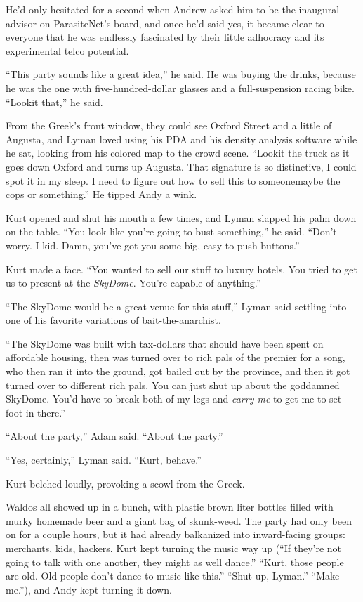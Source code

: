 He'd only hesitated for a second when Andrew asked him to be the
inaugural advisor on ParasiteNet's board, and once he'd said yes, it
became clear to everyone that he was endlessly fascinated by their
little adhocracy and its experimental telco potential.

``This party sounds like a great idea,'' he said.  He was buying the
drinks, because he was the one with five-hundred-dollar glasses and a
full-suspension racing bike.  ``Lookit that,'' he said.

From the Greek's front window, they could see Oxford Street and a
little of Augusta, and Lyman loved using his PDA and his density
analysis software while he sat, looking from his colored map to the
crowd scene.  ``Lookit the truck as it goes down Oxford and turns up
Augusta.  That signature is so distinctive, I could spot it in my
sleep.  I need to figure out how to sell this to someone\dash{}maybe the
cops or something.'' He tipped Andy a wink.

Kurt opened and shut his mouth a few times, and Lyman slapped his palm
down on the table.  ``You look like you're going to bust something,''
he said.  ``Don't worry.  I kid.  Damn, you've got you some big,
easy-to-push buttons.''

Kurt made a face.  ``You wanted to sell our stuff to luxury hotels. 
You tried to get us to present at the \textit{SkyDome}.  You're
capable of anything.''

``The SkyDome would be a great venue for this stuff,'' Lyman said
settling into one of his favorite variations of bait-the-anarchist.

``The SkyDome was built with tax-dollars that should have been spent
on affordable housing, then was turned over to rich pals of the
premier for a song, who then ran it into the ground, got bailed out by
the province, and then it got turned over to different rich pals.  You
can just shut up about the goddamned SkyDome.  You'd have to break
both of my legs and \textit{carry me} to get me to set foot in
there.''

``About the party,'' Adam said.  ``About the party.''

``Yes, certainly,'' Lyman said.  ``Kurt, behave.''

Kurt belched loudly, provoking a scowl from the Greek.

 Waldos all showed up in a bunch, with plastic brown liter bottles
filled with murky homemade beer and a giant bag of skunk-weed.  The
party had only been on for a couple hours, but it had already
balkanized into inward-facing groups:  merchants, kids, hackers.  Kurt
kept turning the music way up (``If they're not going to talk with one
another, they might as well dance.'' ``Kurt, those people are old. 
Old people don't dance to music like this.'' ``Shut up, Lyman.''
``Make me.''), and Andy kept turning it down.

